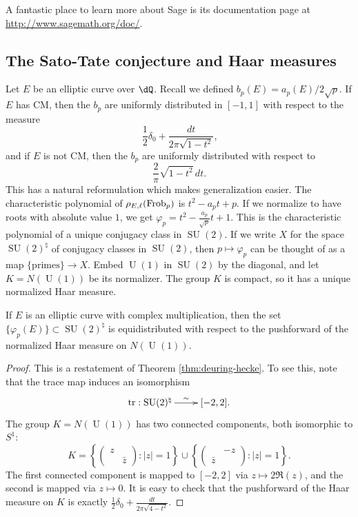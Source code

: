 A fantastic place to learn more about Sage is its documentation page at 
\url{http://www.sagemath.org/doc/}. 






\subsection{The Sato-Tate conjecture and Haar measures}

Let $E$ be an elliptic curve over $\dQ$. Recall we defined 
$b_p(E) = a_p(E)/2\sqrt p$. If $E$ has CM, then the $b_p$ are 
uniformly distributed in $[-1,1]$ with respect to the measure 
\[
  \frac 1 2 \delta_0 + \frac{dt}{2\pi\sqrt{1-t^2}} \text{,}
\]
and if $E$ is not CM, then the $b_p$ are uniformly distributed with respect to 
\[
  \frac{2}{\pi} \sqrt{1-t^2}\, dt \text{.}
\]
This has a natural reformulation which makes generalization easier. The 
characteristic polynomial of $\rho_{E,\ell}(\mathrm{Frob}_p)$ is 
$t^2-a_p t + p$. If we normalize to have roots with absolute value $1$, we get 
$\varphi_p = t^2 - \frac{a_p}{\sqrt p} t + 1$. This is the characteristic 
polynomial of a unique conjugacy class in $\operatorname{SU}(2)$. If we write 
$X$ for the space $\operatorname{SU}(2)^\natural$ of 
conjugacy classes in $\operatorname{SU}(2)$, then $p\mapsto \varphi_p$ can be 
thought of as a map $\{\text{primes}\} \to X$. Embed $\operatorname{U}(1)$ in 
$\operatorname{SU}(2)$ by the diagonal, and let $K=N(\operatorname{U}(1))$ be 
its normalizer. The group $K$ is compact, so it has a unique normalized Haar 
measure.

\begin{theorem}
If $E$ is an elliptic curve with complex multiplication, then the 
set $\{\varphi_p(E)\}\subset \operatorname{SU}(2)^\natural$ is 
equidistributed with respect to the pushforward of the normalized Haar measure 
on $N(\operatorname{U}(1))$. 
\end{theorem}
\begin{proof}
This is a restatement of Theorem \ref{thm:deuring-hecke}. To see this, note 
that the trace map induces an isomorphism 
\[\xymatrix{
  \trace : \operatorname{SU}(2)^\natural \ar[r]^-\sim 
    & [-2,2] \text{.}
}\]
The group $K=N(\operatorname{U}(1))$ has two connected components, both 
isomorphic to $S^1$:
\[
  K = 
  \left\{\begin{pmatrix} 
    z & \\ 
    & \bar z 
  \end{pmatrix} : |z|=1 \right\} 
  \cup \left\{\begin{pmatrix}
         & -z\\ 
         \bar z & 
       \end{pmatrix} : |z|=1\right\} \text{.}
\]
The first connected component is mapped to $[-2,2]$ via 
$z\mapsto 2\Re (z)$, and the second is mapped via $z\mapsto 0$. It is easy to 
check that the pushforward of the Haar measure on $K$ is exactly 
$\frac 1 2 \delta_0 + \frac{dt}{2\pi \sqrt{4-t^2}}$. 
\end{proof}

